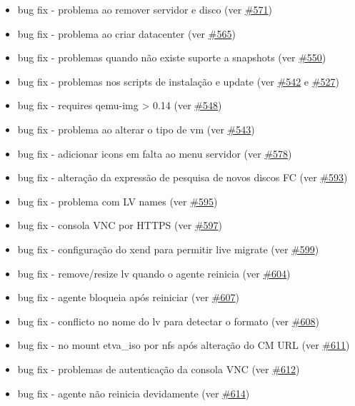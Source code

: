 \begin{itemize}
	\item bug fix - problema ao remover servidor e disco (ver \href{https://srcmaster.eurotux.com/pm/p/etva/ticket/571}{\#571})
	\item bug fix - problema ao criar datacenter (ver \href{https://srcmaster.eurotux.com/pm/p/etva/ticket/565}{\#565})
	\item bug fix - problemas quando não existe suporte a snapshots (ver \href{https://srcmaster.eurotux.com/pm/p/etva/ticket/550}{\#550})
	\item bug fix - problemas nos scripts de instalação e update (ver \href{https://srcmaster.eurotux.com/pm/p/etva/ticket/542}{\#542} e \href{https://srcmaster.eurotux.com/pm/p/etva/ticket/527}{\#527})
	\item bug fix - requires qemu-img > 0.14 (ver \href{https://srcmaster.eurotux.com/pm/p/etva/ticket/548}{\#548})
	\item bug fix - problema ao alterar o tipo de vm (ver \href{https://srcmaster.eurotux.com/pm/p/etva/ticket/543}{\#543})
	\item bug fix - adicionar icons em falta ao menu servidor (ver \href{https://srcmaster.eurotux.com/pm/p/etva/ticket/578}{\#578})
	\item bug fix - alteração da expressão de pesquisa de novos discos FC (ver \href{https://srcmaster.eurotux.com/pm/p/etva/ticket/593}{\#593})
	\item bug fix - problema com LV names (ver \href{https://srcmaster.eurotux.com/pm/p/etva/ticket/595}{\#595})
	\item bug fix - consola VNC por HTTPS (ver \href{https://srcmaster.eurotux.com/pm/p/etva/ticket/597}{\#597})
	\item bug fix - configuração do xend para permitir live migrate (ver \href{https://srcmaster.eurotux.com/pm/p/etva/ticket/599}{\#599})
	\item bug fix - remove/resize lv quando o agente reinicia (ver \href{https://srcmaster.eurotux.com/pm/p/etva/ticket/604}{\#604})
	\item bug fix - agente bloqueia após reiniciar (ver \href{https://srcmaster.eurotux.com/pm/p/etva/ticket/607}{\#607})
	\item bug fix - conflicto no nome do lv para detectar o formato (ver \href{https://srcmaster.eurotux.com/pm/p/etva/ticket/608}{\#608})
	\item bug fix - no mount etva\_iso por nfs após alteração do CM URL (ver \href{https://srcmaster.eurotux.com/pm/p/etva/ticket/611}{\#611})
	\item bug fix - problemas de autenticação da consola VNC (ver \href{https://srcmaster.eurotux.com/pm/p/etva/ticket/612}{\#612})
	\item bug fix - agente não reinicia devidamente (ver \href{https://srcmaster.eurotux.com/pm/p/etva/ticket/614}{\#614})
\end{itemize}

